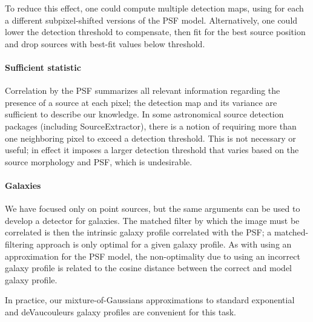 \documentclass[letterpaper,preprint]{aastex62}
\begin{document}
To reduce this effect, one could compute multiple detection maps,
using for each a different subpixel-shifted versions of the PSF model.
Alternatively, one could lower the detection threshold to compensate,
then fit for the best source position and drop sources with best-fit
values below threshold.


\paragraph{Sufficient statistic}  Correlation by the PSF summarizes
all relevant information regarding the presence of a source at each
pixel; the detection map and its variance are sufficient to describe
our knowledge.  In some astronomical source detection packages
(including SourceExtractor), there is a notion of requiring more than
one neighboring pixel to exceed a detection threshold.  This is not
necessary or useful; in effect it imposes a larger detection threshold
that varies based on the source morphology and PSF, which is
undesirable.



\paragraph{Galaxies}
We have focused only on point sources, but the same arguments can be
used to develop a detector for galaxies.  The matched filter by which
the image must be correlated is then the intrinsic galaxy profile
correlated with the PSF; a matched-filtering approach is only optimal
for a given galaxy profile.  As with using an approximation for the
PSF model, the non-optimality due to using an incorrect galaxy profile
is related to the cosine distance between the correct and model galaxy
profile.

In practice, our mixture-of-Gaussians approximations to standard
exponential and deVaucouleurs galaxy profiles \citep{gaussgals} are
convenient for this task.
\end{document}
